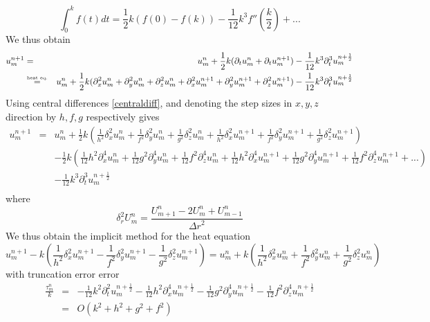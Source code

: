 \begin{equation}
\int_0^k f(t) dt = \frac{1}{2} k (f(0) - f(k)) -\frac{1}{12} k^3 f''(\frac{k}{2}) + ...
\label{trapezoidalrule}
\end{equation}
We thus obtain
\begin{eqnarray}
\label{res}
u_m^ {n+1} &=& u_m^ n + \frac{1}{2} k(\partial_t u_m^n + \partial_t u_m^{n+1}) - \frac{1}{12} k^3 \partial_t ^3 u_m^{n+\frac{1}{2}} \\
&\stackrel{\text{\tiny heat eq.}}{=}& u_m^ n + \frac{1}{2} k(\partial_x^2 u_m^n + \partial_y^2 u_m^n + \partial_z^2 u_m^n + \partial_x^2 u_m^{n+1} + \partial_y^2 u_m^{n+1} + \partial_z^2 u_m^{n+1}) - \frac{1}{12} k^3 \partial_t ^3    u_m^{n+\frac{1}{2}} \nonumber
\end{eqnarray}
Using central differences \cref{centraldiff}, and denoting the step sizes in $x, y, z$ direction by $h, f, g$ respectively gives
\begin{eqnarray*}
u_m^{n+1} &=& u_m^ n + \frac{1}{2} k(\frac{1}{h^2}\delta_x^2 u_m^n + \frac{1}{f^2}\delta_y^2 u_m^n + \frac{1}{g^2}\delta_z^2 u_m^n + \frac{1}{h^2}\delta_x^2 u_m^{n+1} + \frac{1}{f^2}\delta_y^2 u_m^{n+1} + \frac{1}{g^2}\delta_z^2 u_m^{n+1}) \\
  &&- \frac{1}{2} k (\frac{1}{12}h^2\partial_x^4 u_m^n + \frac{1}{12}g^2\partial_y^4 u_m^n + \frac{1}{12}f^2\partial_z^4 u_m^n + \frac{1}{12}h^2\partial_x^4 u_m^{n+1} + \frac{1}{12}g^2\partial_y^4 u_m^{n+1} + \frac{1}{12}f^2\partial_z^4 u_m^{n+1} + ...) \\
  &&- \frac{1}{12} k^3 \partial_t ^3 u_m^{n+\frac{1}{2}} \\ 
\end{eqnarray*}
where
\begin{equation}
\delta_{r}^{2}U_m^{n}=\frac{U_{m+1}^{n}-2U_m^{n}+U_{m-1}^{n}}{{\Delta r}^{2}}
\label{centraldiff}
\end{equation}
We thus obtain the implicit method for the heat equation
\begin{equation}
u_m^{n+1}-k(\frac{1}{h^2}\delta_x^2 u_m^{n+1}-\frac{1}{f^2}\delta_y^2 u_m^{n+1}-\frac{1}{g^2}\delta_z^2 u_m^{n+1})=u_m^n + k(\frac{1}{h^2}\delta_x^2 u_m^n + \frac{1}{f^2}\delta_y^2 u_m^n +\frac{1}{g^2}\delta_z^2 u_m^n)
\label{crank}
\end{equation}
with truncation error error
\begin{eqnarray}
\frac{\tau_m^ n}{k} &=& -\frac{1}{12} k^2 \partial_t^2 u_m^{n+\frac{1}{2}} - \frac{1}{12} h^2 \partial_x^4 u_m^{n+\frac{1}{2}} - \frac{1}{12} g^2 \partial_y^4 u_m^{n+\frac{1}{2}} - \frac{1}{12} f^2 \partial_z^4 u_m^{n+\frac{1}{2}}\\
&=& O(k^2 + h^2 + g^2 + f^2)
\label{truncerror}
\end{eqnarray}

